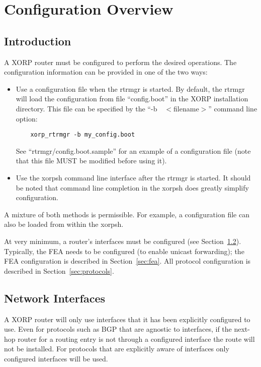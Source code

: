 %
%

\chapter{Configuration Overview}
\section{Introduction}

A XORP router must be configured to perform the desired operations.
The configuration information can be provided in one of the two ways:

\begin{itemize}
\item
  Use a configuration file when the rtrmgr is started.
  By default, the rtrmgr will load the configuration from file
  ``config.boot'' in the XORP installation directory.
  This file can be specified by the ``-b~~$<$filename$>$'' command line
  option:
\begin{verbatim}
    xorp_rtrmgr -b my_config.boot
\end{verbatim}

    See ``rtrmgr/config.boot.sample'' for an example of a
    configuration file (note that this file MUST be modified
    before using it).

\item
  Use the xorpsh command line interface after the rtrmgr is started.
  It should be noted that command line completion in the xorpsh
  does greatly simplify configuration.
\end{itemize}

\noindent
A mixture of both methods is permissible. For example,
a configuration file can also be loaded from within the xorpsh.

At very minimum, a router's interfaces must be configured (see
Section~\ref{sec:network_interfaces}). Typically, the FEA needs to be
configured (\eg to enable unicast forwarding); the FEA configuration is
described in Section~\ref{sec:fea}. All protocol configuration is
described in Section~\ref{sec:protocols}.

\section{Network Interfaces}
\label{sec:network_interfaces}

A XORP router will only use interfaces that it has been explicitly
configured to use. Even for protocols such as BGP that are agnostic to
interfaces, if the next-hop router for a routing entry is not through
a configured interface the route will not be installed. For protocols
that are explicitly aware of interfaces only configured interfaces
will be used.

